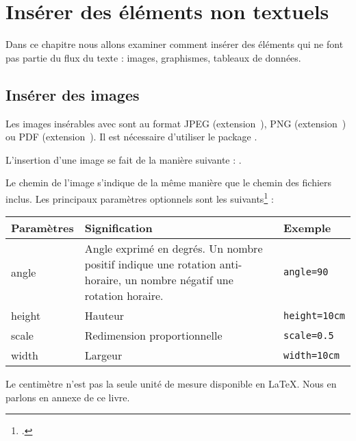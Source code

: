 \chapter{Insérer des éléments non textuels}

\begin{intro}
    Dans ce chapitre nous allons examiner comment insérer des éléments qui ne font pas partie du flux du texte : images, graphismes, tableaux de données.
\end{intro}

\section{Insérer des images}

Les images insérables avec \XeLaTeX sont au format JPEG (extension~), PNG (extension~) ou PDF (extension~). Il est nécessaire d'utiliser le package .


L'insertion d'une image se fait de la manière suivante : .

Le chemin de l'image s'indique de la même manière que le chemin des fichiers inclus.
Les principaux paramètres optionnels sont les suivants\footcite[Pour les autres, on consultera][]{graphicx_options} :

\begin{longtable}{|p{0.2\linewidth}|p{0.6\linewidth}|p{0.2\linewidth}|}
    \hline
    \centering\textbf{Paramètres} & \centering\textbf{Signification} & \centering\textbf{Exemple}    \tabularnewline
    \hline
    \endhead
    \hline
    \endfoot
    angle        & Angle exprimé en degrés. Un nombre positif indique une rotation anti-horaire, un nombre négatif une rotation horaire.     & \verb|angle=90| \\
    height        & Hauteur    & \verb|height=10cm|     \\
    scale        & Redimension proportionnelle & \verb|scale=0.5|\\
    width        & Largeur     & \verb|width=10cm|     \\
\end{longtable}

\begin{plusloins}
Le centimètre n'est pas la seule  unité de mesure disponible en \LaTeX. Nous en parlons en annexe de ce livre.
\end{plusloins}

